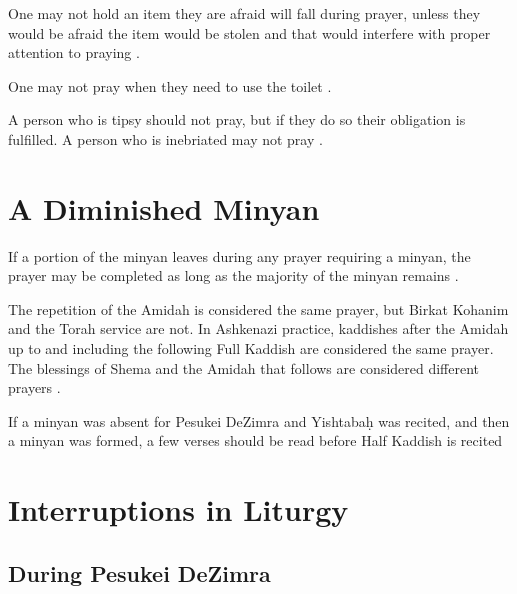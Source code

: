 \documentclass[11pt]{article}
\begin{document}
One may not hold an item they are afraid will fall during prayer, unless they would be afraid the item would be stolen and that would interfere with proper attention to praying \parencite[5:7 citing OC 96]{PH}.

One may not pray when they need to use the toilet \parencite*[5:8 citing Berakhot 15a]{PH}.

A person who is tipsy should not pray, but if they do so their obligation is fulfilled.  A person who is inebriated may not pray \parencite*[5:11 citing OC 99]{PH}.

\section{A Diminished Minyan}

If a portion of the minyan leaves during any prayer requiring a minyan, the prayer may be completed as long as the majority of the minyan remains  \parencite*[2:10 citing OC 55]{PH}.

The repetition of the Amidah is considered the same prayer, but Birkat Kohanim and the Torah service are not. In Ashkenazi practice, kaddishes after the Amidah up to and including the following Full Kaddish are considered the same prayer. The blessings of Shema and the Amidah that follows are considered different prayers \parencite*{PH}.

If a minyan was absent for Pesukei DeZimra and Yishtaba\d{h} was recited, and then a minyan was formed, a few verses should be read before Half Kaddish is recited \parencite*[15:1]{Kitzur}

\section{Interruptions in Liturgy}

\subsection{During Pesukei DeZimra}
\end{document}
